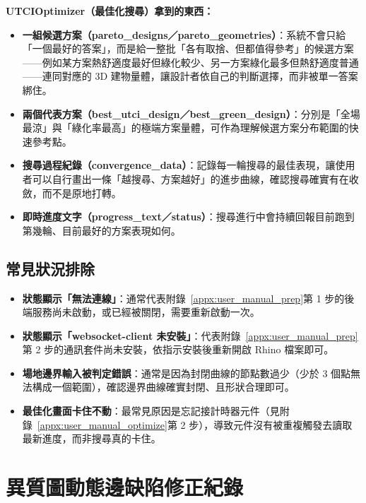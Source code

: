 \textbf{UTCIOptimizer（最佳化搜尋）拿到的東西：}

\begin{itemize}
    \item \textbf{一組候選方案（pareto\_designs／pareto\_geometries）}：系統不會只給「一個最好的答案」，而是給一整批「各有取捨、但都值得參考」的候選方案——例如某方案熱舒適度最好但綠化較少、另一方案綠化最多但熱舒適度普通——連同對應的 3D 建物量體，讓設計者依自己的判斷選擇，而非被單一答案綁住。
    \item \textbf{兩個代表方案（best\_utci\_design／best\_green\_design）}：分別是「全場最涼」與「綠化率最高」的極端方案量體，可作為理解候選方案分布範圍的快速參考點。
    \item \textbf{搜尋過程紀錄（convergence\_data）}：記錄每一輪搜尋的最佳表現，讓使用者可以自行畫出一條「越搜尋、方案越好」的進步曲線，確認搜尋確實有在收斂，而不是原地打轉。
    \item \textbf{即時進度文字（progress\_text／status）}：搜尋進行中會持續回報目前跑到第幾輪、目前最好的方案表現如何。
\end{itemize}

\subsection{常見狀況排除}
\label{appx:user_manual_troubleshoot}

\begin{itemize}
    \item \textbf{狀態顯示「無法連線」}：通常代表附錄~\ref{appx:user_manual_prep}第 1 步的後端服務尚未啟動，或已經被關閉，需要重新啟動一次。
    \item \textbf{狀態顯示「websocket-client 未安裝」}：代表附錄~\ref{appx:user_manual_prep}第 2 步的通訊套件尚未安裝，依指示安裝後重新開啟 Rhino 檔案即可。
    \item \textbf{場地邊界輸入被判定錯誤}：通常是因為封閉曲線的節點數過少（少於 3 個點無法構成一個範圍），確認邊界曲線確實封閉、且形狀合理即可。
    \item \textbf{最佳化畫面卡住不動}：最常見原因是忘記接計時器元件（見附錄~\ref{appx:user_manual_optimize}第 2 步），導致元件沒有被重複觸發去讀取最新進度，而非搜尋真的卡住。
\end{itemize}


\section{異質圖動態邊缺陷修正紀錄}
\label{appx:dynamic_edges_fix}

